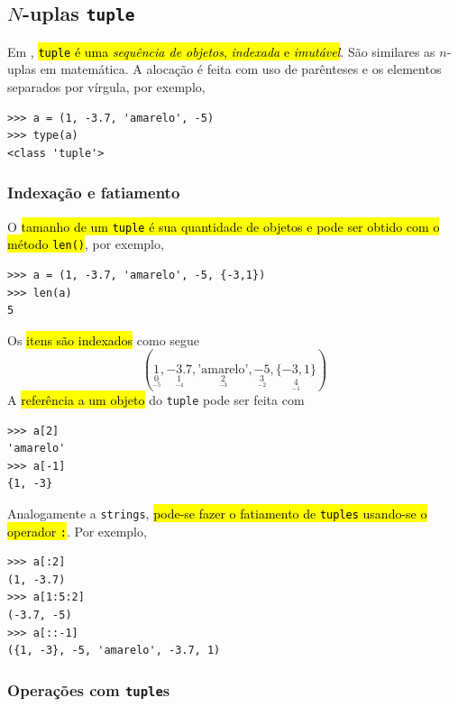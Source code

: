 \subsection{$N$-uplas \texttt{tuple}}

Em \python, \hl{\texttt{tuple} é uma \emph{sequência de objetos}, \emph{indexada} e \emph{imutável}}. São similares as $n$-uplas em matemática. A alocação é feita com uso de parênteses e os elementos separados por vírgula, por exemplo,

\begin{lstlisting}
>>> a = (1, -3.7, 'amarelo', -5)
>>> type(a)
<class 'tuple'>
\end{lstlisting}

\subsubsection{Indexação e fatiamento}

O \hl{tamanho de um \texttt{tuple} é sua quantidade de objetos e pode ser obtido com o método \texttt{len()}}, por exemplo,

\begin{lstlisting}
>>> a = (1, -3.7, 'amarelo', -5, {-3,1})
>>> len(a)
5
\end{lstlisting}

Os \hl{itens são indexados} como segue
\begin{equation}
  (\underset{\underset{-5}{0}}{1}, \underset{\underset{-4}{1}}{-3.7}, \underset{\underset{-3}{2}}{\text{'amarelo'}}, \underset{\underset{-2}{3}}{-5}, \underset{\underset{-1}{4}}{\{-3, 1\}})
\end{equation}
A \hl{referência a um objeto} do \lstinline+tuple+ pode ser feita com

\begin{lstlisting}
>>> a[2]
'amarelo'
>>> a[-1]
{1, -3}
\end{lstlisting}

Analogamente a \lstinline+strings+, \hl{pode-se fazer o fatiamento de \texttt{tuples} usando-se o operador \texttt{:}}. Por exemplo,

\begin{lstlisting}
>>> a[:2]
(1, -3.7)
>>> a[1:5:2]
(-3.7, -5)
>>> a[::-1]
({1, -3}, -5, 'amarelo', -3.7, 1)
\end{lstlisting}

\subsubsection{Operações com \lstinline+tuple+s}

